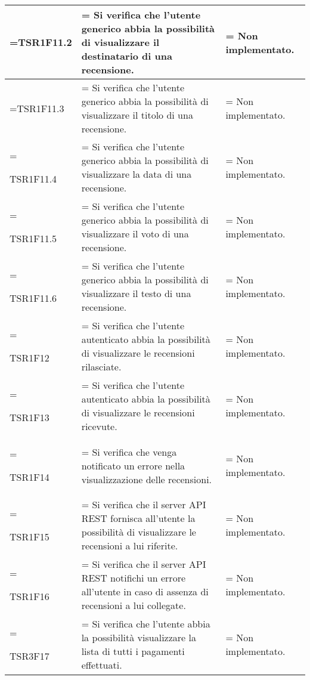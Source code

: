 \begin{xltabular}{\textwidth} {
            >{\hsize\linewidth=\hsize}X
            >{\hsize\linewidth=\hsize}X
            >{\hsize\linewidth=\hsize}X
        }
        TSR1F11.2 &
        Si verifica che l'utente generico abbia la possibilità di visualizzare il destinatario di una recensione.  &
        Non implementato.
        \\ \hline

        TSR1F11.3 &
        Si verifica che l'utente generico abbia la possibilità di visualizzare il titolo di una recensione.  &
        Non implementato.
        \\ \hline

        TSR1F11.4 &
        Si verifica che l'utente generico abbia la possibilità di visualizzare la data di una recensione.  &
        Non implementato.
        \\ \hline

        TSR1F11.5 &
        Si verifica che l'utente generico abbia la possibilità di visualizzare il voto di una recensione.  &
        Non implementato.
        \\ \hline

        TSR1F11.6 &
        Si verifica che l'utente generico abbia la possibilità di visualizzare il testo di una recensione.  &
        Non implementato.
        \\ \hline

        TSR1F12 &
        Si verifica che l'utente autenticato abbia la possibilità di visualizzare le recensioni rilasciate.  &
        Non implementato.
        \\ \hline

        TSR1F13 &
        Si verifica che l'utente autenticato abbia la possibilità di visualizzare le recensioni ricevute.  &
        Non implementato.
        \\ \hline

        TSR1F14 &
        Si verifica che venga notificato un errore nella visualizzazione delle recensioni.  &
        Non implementato.
        \\ \hline

        TSR1F15 &
        Si verifica che il server API REST fornisca all'utente la possibilità di visualizzare le recensioni a lui riferite. &
        Non implementato.
        \\ \hline

        TSR1F16 &
        Si verifica che il server API REST notifichi un errore all'utente in caso di assenza di recensioni a lui collegate. &
        Non implementato.
        \\ \hline


        TSR3F17 &
        Si verifica che l'utente abbia la possibilità visualizzare la lista di tutti i pagamenti
        effettuati. &
        Non implementato.
        \\ \hline


\end{xltabular}
